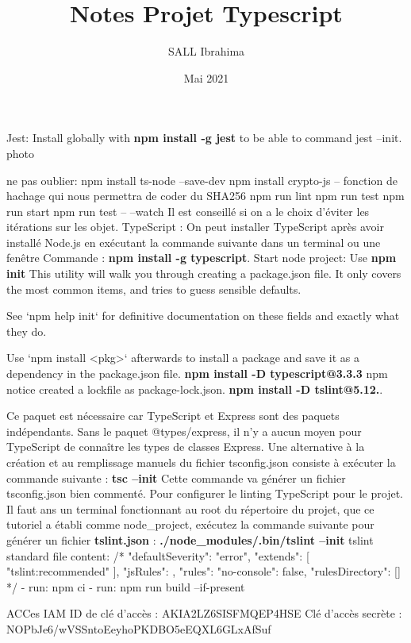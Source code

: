 \documentclass[table]{article}
\title{Notes Projet Typescript}
\author{SALL Ibrahima}
\date{Mai 2021}
\begin{document}



Jest: Install globally with \textbf{npm install -g jest} to be able to command jest --init.
photo

ne pas oublier:     npm install ts-node --save-dev
npm install crypto-js -- fonction de hachage qui nous permettra de coder du SHA256
npm run lint
npm run test 
npm run start
npm run test -- --watch
\newline Il est conseillé si on a le choix d'éviter les itérations sur les objet.
\newline TypeScript : On peut installer TypeScript après avoir installé Node.js en exécutant la commande suivante dans un terminal ou une fenêtre Commande : \textbf{npm install -g typescript}.
\newline Start node project: Use \textbf{npm init} 
This utility will walk you through creating a package.json file.
It only covers the most common items, and tries to guess sensible defaults.

See `npm help init` for definitive documentation on these fields
and exactly what they do.

Use `npm install <pkg>` afterwards to install a package and
save it as a dependency in the package.json file. 
\newline \textbf{npm install -D typescript@3.3.3} npm notice created a lockfile as package-lock.json.
\newline \textbf{npm install -D tslint@5.12.}.

\newline Ce paquet est nécessaire car TypeScript et Express sont des paquets indépendants. Sans le paquet @types/express, il n'y a aucun moyen pour TypeScript de connaître les types de classes Express.
\newline Une alternative à la création et au remplissage manuels du fichier tsconfig.json consiste à exécuter la commande suivante :
\textbf{tsc --init} Cette commande va générer un fichier tsconfig.json bien commenté.
\newline Pour configurer le linting TypeScript pour le projet. Il faut ans un terminal fonctionnant au root du répertoire du projet, que ce tutoriel a établi comme node_project, exécutez la commande suivante pour générer un fichier \textbf{tslint.json} :
\textbf{./node_modules/.bin/tslint --init}
\newline tslint standard file content: /*{
    "defaultSeverity": "error",
    "extends": [
        "tslint:recommended"
    ],
    "jsRules": {},
    "rules": {"no-console": false},
    "rulesDirectory": []
}*/
\newline - run: npm ci
- run: npm run build --if-present


ACCes IAM
ID de clé d'accès :
AKIA2LZ6SISFMQEP4HSE
Clé d'accès secrète :
NOPbJe6/wVSSntoEeyhoPKDBO5eEQXL6GLxAfSuf
\end{document}
